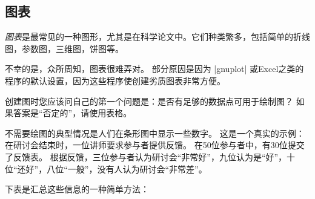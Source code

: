 \subsection{图表}


\emph{图表}是最常见的一种图形，尤其是在科学论文中。它们种类繁多，包括简单的折线图，参数图，三维图，饼图等。


不幸的是，众所周知，图表很难弄对。 部分原因是因为 |gnuplot| 或Excel之类的程序的默认设置，因为这些程序使创建劣质图表非常方便。


创建图时您应该问自己的第一个问题是：是否有足够的数据点可用于绘制图？ 如果答案是``否定的''，请使用表格。


不需要绘图的典型情况是人们在条形图中显示一些数字。 这是一个真实的示例：在研讨会结束时，一位讲师要求参与者提供反馈。 在50位参与者中，有30位提交了反馈表。 根据反馈，三位参与者认为研讨会``非常好''，九位认为是``好''，十位``还好''，八位``一般''，没有人认为研讨会``非常差''。


下表是汇总这些信息的一种简单方法：


